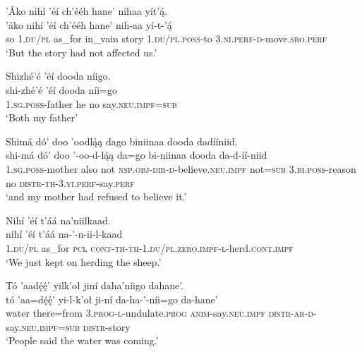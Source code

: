 \ea\label{ex:text6-13-5}
’Áko nihí ’éí ch’ééh hane’ nihaa yít’ą́.\\
\gll ’áko	nihí	’éí	ch’ééh	hane’	nih-aa	yí-t-’ą́\\
     so	1.\textsc{du}/\textsc{pl}	as\_for	in\_vain	story	1.\textsc{du}/\textsc{pl}.\textsc{poss}-to	3.\textsc{ni}.\textsc{perf}-\textsc{d}-move.\textsc{sro}.\textsc{perf}\\
\glt `But the story had not affected us.'
\z

\ea\label{ex:text6-13-6}
Shizhé’é ’éí dooda níigo.\\
\gll shi-zhé’é	’éí	dooda	níi=go\\
     1.\textsc{sg}.\textsc{poss}-father	he	no	say.\textsc{neu}.\textsc{impf}=\textsc{sub}\\
\glt `Both my father'
\z

\ea\label{ex:text6-13-7}
Shimá dó’ doo ’oodlą́ą dago biniinaa dooda dadííniid.\\
\gll shi-má	dó’	doo	’-oo-d-lą́ą	da=go	bi-niinaa	dooda	da-d-íí-niid\\
     1.\textsc{sg}.\textsc{poss}-mother	also	not	\textsc{nsp}.\textsc{obj}-\textsc{dir}-\textsc{d}-believe.\textsc{neu}.\textsc{impf}	not=\textsc{sub}	3.\textsc{bi}.\textsc{poss}-reason	no	\textsc{distr}-\textsc{th}-3.\textsc{yi}.\textsc{perf}-say.\textsc{perf}\\
\glt `and my mother had refused to believe it.'
\z

\ea\label{ex:text6-13-8}
Nihí ’éí t’áá na’niilkaad.\\
\gll nihí	’éí	t’áá	na-’-n-ii-l-kaad\\
     1.\textsc{du}/\textsc{pl}	as\_for	\textsc{pcl}	\textsc{cont}-\textsc{th}-\textsc{th}-1.\textsc{du}/\textsc{pl}.\textsc{zero}.\textsc{impf}-\textsc{l}-herd.\textsc{cont}.\textsc{impf}\\
\glt `We just kept on herding the sheep.'
\z

\ea\label{ex:text6-13-9}
Tó ’aadę́ę́’ yilk’oł jiní daha’níigo dahane’.\\
\gll tó	’aa=dę́ę́’	yi-l-k’oł	ji-ní	da-ha-’-níi=go	da-hane’\\
     water	there=from	3.\textsc{prog}-\textsc{l}-undulate.\textsc{prog}	\textsc{anim}-say.\textsc{neu}.\textsc{impf}	\textsc{distr}-\textsc{ar}-\textsc{d}-say.\textsc{neu}.\textsc{impf}=\textsc{sub}	\textsc{distr}-story\\
\glt `People said the water was coming.'
\z

